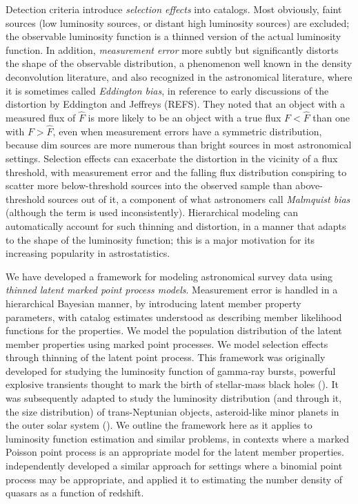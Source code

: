 Detection criteria introduce \emph{selection effects} into catalogs.
Most obviously, faint sources (low luminosity sources, or distant high luminosity sources) are excluded; the observable luminosity function is a thinned version of the actual luminosity function.
In addition, \emph{measurement error} more subtly but significantly distorts the shape of the observable distribution, a phenomenon well known in the density deconvolution literature, and also recognized in the astronomical literature, where it is sometimes called \emph{Eddington bias}, in reference to early discussions of the distortion by Eddington and Jeffreys (REFS).
They noted that an object with a measured flux of $\hat F$ is more likely to be an object with a true flux $F < \hat F$ than one with $F > \hat F$, even when measurement errors have a symmetric distribution, because dim sources are more numerous than bright sources in most astronomical settings.
Selection effects can exacerbate the distortion in the vicinity of a flux threshold, with measurement error and the falling flux distribution conspiring to scatter more below-threshold sources into the observed sample than above-threshold sources out of it, a component of what astronomers call \emph{Malmquist bias} \citep{binney1998galactic} (although the term is used inconsistently).
Hierarchical modeling can automatically account for such thinning and distortion, in a manner that adapts to the shape of the luminosity function; this is a major motivation for its increasing popularity in astrostatistics.

We have developed a framework for modeling astronomical survey data using \emph{thinned latent marked point process models}.
Measurement error is handled in a hierarchical Bayesian manner, by introducing latent member property parameters, with catalog estimates understood as describing member likelihood functions for the properties.
We model the population distribution of the latent member properties using marked point processes.
We model selection effects through thinning of the latent point process.
This framework was originally developed for studying the luminosity function of gamma-ray bursts, powerful explosive transients thought to mark the birth of stellar-mass black holes (\citealt{LW95-GRBs-TLPP,LW98-GRBs-Iso}).
It was subsequently adapted to study the luminosity distribution (and through it, the size distribution) of trans-Neptunian objects, asteroid-like minor planets in the outer solar system (\citealt{L04-MsmtErr,P+08-TNOSizeDistn}).
We outline the framework here as it applies to luminosity function estimation and similar problems, in contexts where a marked Poisson point process is an appropriate model for the latent member properties.
\cite{kelly2008flexible} independently developed a similar approach for settings where a binomial point process may be appropriate, and applied it to estimating the number density of quasars as a function of redshift.

